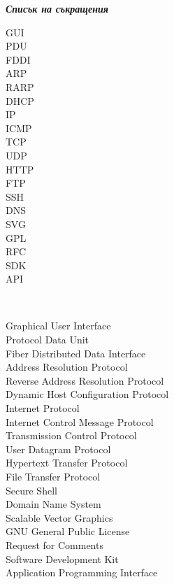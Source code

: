 \documentclass[12pt,a4paper,oneside]{book}
\begin{document}
\newpage
\begin{flushleft}
\begin{Large}
\emph{\bf Списък на съкращения}\\
\end{Large}
\end{flushleft}
\begin{spacing}{1.241}
\vspace{10mm}
\begin{minipage}{0.2\textwidth}
\begin{flushleft} \normalsize
GUI\\
PDU\\
FDDI\\
ARP\\
RARP\\
DHCP\\
IP\\
ICMP\\
TCP\\
UDP\\
HTTP\\
FTP\\
SSH\\
DNS\\
SVG\\
GPL\\
RFC\\
SDK\\
API\\
\end{flushleft}
\end{minipage}
~
\begin{minipage}{0.5\textwidth}
\begin{flushleft} \normalsize
Graphical User Interface\\
Protocol Data Unit\\
Fiber Distributed Data Interface\\
Address Resolution Protocol\\
Reverse Address Resolution Protocol\\
Dynamic Host Configuration Protocol\\
Internet Protocol\\
Internet Control Message Protocol\\
Transmission Control Protocol\\
User Datagram Protocol\\
Hypertext Transfer Protocol\\
File Transfer Protocol\\
Secure Shell\\
Domain Name System\\
Scalable Vector Graphics\\
GNU General Public License\\
Request for Comments\\
Software Development Kit\\
Application Programming Interface\\
\end{flushleft}
\end{minipage}\\[4cm]
\end{spacing}
\vfill
\end{document}

